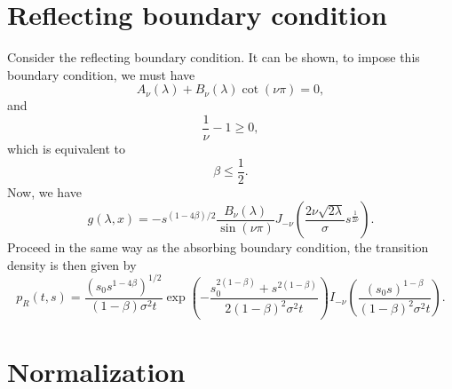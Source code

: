\documentclass[12pt]{article}
\begin{document}
\section{Reflecting boundary condition}

  Consider the reflecting boundary condition. It can be shown, to impose this boundary condition, we must have
  \begin{equation}
    A_{\nu}(\lambda)+B_{\nu}(\lambda)\cot(\nu\pi)=0,
  \end{equation}
  and
  \begin{equation}
    \frac{1}{\nu}-1\geq 0,
  \end{equation}
  which is equivalent to
  \begin{equation}
    \beta \leq \frac{1}{2}.
  \end{equation}
  Now, we have
  \begin{equation}
    g(\lambda,x)=-s^{(1-4\beta)/2}\frac{B_{\nu}(\lambda)}{\sin(\nu\pi)}J_{-\nu}\left(\frac{2\nu\sqrt{2\lambda}}{\sigma}s^{\frac{1}{2\nu}}\right).
  \end{equation}
  Proceed in the same way as the absorbing boundary condition, the transition density is then given by
  \begin{equation}
    p_R(t,s)=\frac{\left(s_0s^{1-4\beta}\right)^{1/2}}{(1-\beta)\sigma^2t}
    \exp\left(-\frac{s_0^{2(1-\beta)}+s^{2(1-\beta)}}{2(1-\beta)^2\sigma^2t}\right)
    I_{-\nu}\left(\frac{\left(s_0s\right)^{1-\beta}}{(1-\beta)^2\sigma^2t}\right).
    \label{pR}
  \end{equation}

\section{Normalization}
\end{document}
